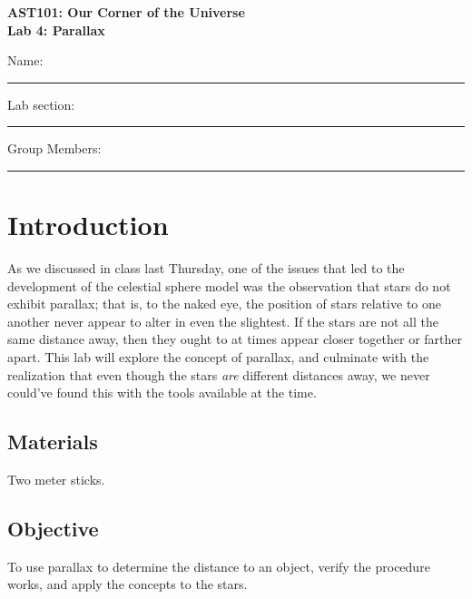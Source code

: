 \documentclass[11pt]{article}
\begin{document}
\begin{center}
\textbf{\Large
AST101: Our Corner of the Universe \\
\vspace*{0.1cm}
Lab 4: Parallax
}
\end{center}

\vspace*{0.5cm}

{\Large Name:}\vspace*{0.5cm}\\\hrule
{\Large Lab section:}\vspace*{0.5cm}\\\hrule
{\Large Group Members:}\vspace*{0.5cm}\\\hrule
\vspace*{0.5cm}

\section{Introduction}

As we discussed in class last Thursday, one of the issues that led to the development of the celestial sphere model was the observation that stars do not exhibit parallax; that is, to the naked eye, the position of stars relative to one another never appear to alter in even the slightest. If the stars are not all the same distance away, then they ought to at times appear closer together or farther apart. This lab will explore the concept of parallax, and culminate with the realization that even though the stars {\it are} different distances away, we never could've found this with the tools available at the time. 

\subsection*{Materials}

Two meter sticks.

\subsection*{Objective}

To use parallax to determine the distance to an object, verify the procedure works, and apply the concepts to the stars.
\end{document}
